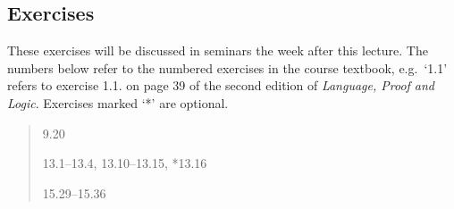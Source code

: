 \documentclass[12pt]{extarticle}
\begin{document}
\begin{multicols*}{3}
\begin{minipage}{\columnwidth}
\section{Exercises}
These exercises will be discussed in seminars the week after this lecture.
The numbers below refer to the numbered exercises in the course textbook, e.g.\ `1.1' refers to exercise 1.1. on page 39 of the second edition of \emph{Language, Proof and Logic}. Exercises marked `*' are optional.
 
\begin{quote}
9.20
 
13.1--13.4, 13.10--13.15, *13.16
 
15.29--15.36
 
\end{quote}
\end{minipage}

 


\end{multicols*}
\end{document}
